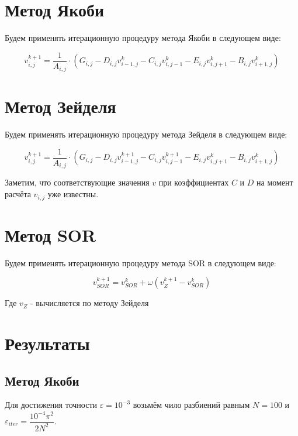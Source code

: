 \documentclass[12pt]{article}
\begin{document}
\section{Метод Якоби}

Будем применять итерационную процедуру метода Якоби в следующем виде:

\begin{equation}
v_{i,j}^{k+1} = \dfrac{1}{A_{i,j}} \cdot (G_{i,j} - D_{i,j}v_{i-1,j}^{k} - C_{i,j}v_{i,j-1}^{k} - E_{i,j}v_{i,j+1}^{k} - B_{i,j}v_{i+1,j}^{k})
\end{equation}

\section{Метод Зейделя}

Будем применять итерационную процедуру метода Зейделя в следующем виде:

\begin{equation}
v_{i,j}^{k+1} = \dfrac{1}{A_{i,j}} \cdot (G_{i,j} - D_{i,j}v_{i-1,j}^{k+1} - C_{i,j}v_{i,j-1}^{k+1} - E_{i,j}v_{i,j+1}^{k} - B_{i,j}v_{i+1,j}^{k})
\end{equation}

Заметим, что соответствующие значения $v$ при коэффициентах $C$ и $D$ на момент расчёта $v_{i,j}$ уже известны.

\section{Метод SOR}

Будем применять итерационную процедуру метода SOR в следующем виде:

\begin{equation}
v_{SOR}^{k+1} = v_{SOR}^{k} + \omega (v_{Z}^{k+1} - v_{SOR}^{k})
\end{equation}

Где $v_{Z}$ - вычисляется по методу Зейделя

\section{Результаты}
\subsection{Метод Якоби}

Для достижения точности $\varepsilon = 10^{-3}$ возьмём чило разбиений равным $N = 100$ и $\varepsilon_{iter} = \dfrac{10^{-4}\pi^2}{2N^2}$. 
\end{document}
